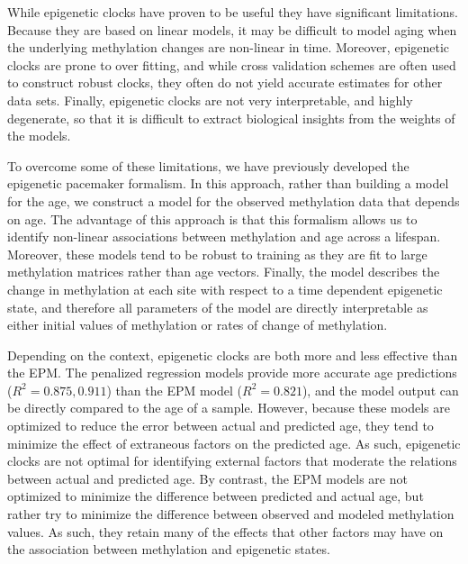 \documentclass{article}
\begin{document}
{\begin{linenumbers}
While epigenetic clocks have proven to be useful they have significant limitations.  Because they are based on linear 
models, it may be difficult to model aging when the underlying methylation changes are non-linear in time.  Moreover, 
epigenetic clocks are prone to over fitting, and while cross validation schemes are often used to construct 
robust clocks, they often do not yield accurate estimates for other data sets.  Finally, epigenetic clocks are not 
very interpretable, and highly degenerate, so that it is difficult to extract biological insights from the weights 
of the models.

To overcome some of these limitations, we have previously developed the epigenetic pacemaker formalism.  In this 
approach, rather than building a model for the age, we construct a model for the observed methylation data that 
depends on age.  The advantage of this approach is that this formalism allows us to identify non-linear associations 
between methylation and age across a lifespan.  Moreover, these models tend to be robust to training as they are fit 
to large methylation matrices rather than age vectors. Finally, the model describes the change in methylation at each 
site with respect to a time dependent epigenetic state, and therefore all parameters of the model are directly 
interpretable as either initial values of methylation or rates of change of methylation.

Depending on the context, epigenetic clocks are both more and less effective than the EPM. The penalized regression 
models provide more accurate age predictions ($R^2=0.875,0.911$) than the EPM model ($R^2=0.821$), and the model 
output can be directly compared to the age of a sample. However, because these models are optimized to reduce the 
error between actual and predicted age, they tend to minimize the effect of extraneous factors on the predicted age.  
As such, epigenetic clocks are not optimal for identifying external factors that moderate the relations between actual 
and predicted age.  By contrast, the EPM models are not optimized to minimize the difference between predicted and 
actual age, but rather try to minimize the difference between observed and modeled methylation values.  As such, they 
retain many of the effects that other factors may have on the association between methylation and epigenetic states.  


\end{linenumbers}}
\end{document}
